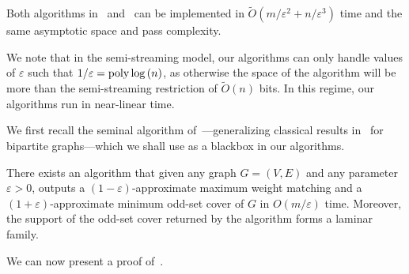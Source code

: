 \documentclass{article}
\newcommand{\Ot}{\widetilde{O}}
\newcommand{\eps}{\varepsilon}
\newcommand{\poly}{\mbox{\rm poly}}
\begin{document}
\begin{corollary}\label{cor:time-efficient}
	Both algorithms in~ and~ can be implemented in $\Ot(m/\eps^2 + n/\eps^3)$ time and the same asymptotic space and pass complexity. 
\end{corollary}
\noindent
We note that in the semi-streaming model, our algorithms can only handle values of $\eps$ such that $1/\eps = \poly\log{(n)}$, as otherwise the space of the algorithm will be more than the semi-streaming restriction of $\Ot(n)$ bits. 
In this regime, our algorithms run in near-linear time. 

We first recall the seminal algorithm of~\cite{DuanP14}---generalizing classical results in~\cite{HopcroftK73} for bipartite graphs---which we shall use as a blackbox in our algorithms. 

\begin{proposition}\label{prop:DuanP14}
	There exists an algorithm that given any graph $G=(V,E)$ and any parameter $\eps > 0$, outputs a $(1-\eps)$-approximate maximum weight matching and a $(1+\eps)$-approximate minimum odd-set cover of $G$ 
	in $O(m/\eps)$ time. Moreover, the support of the odd-set cover returned by the algorithm forms a laminar family. 
\end{proposition}

We can now present a proof of~. 
\end{document}
